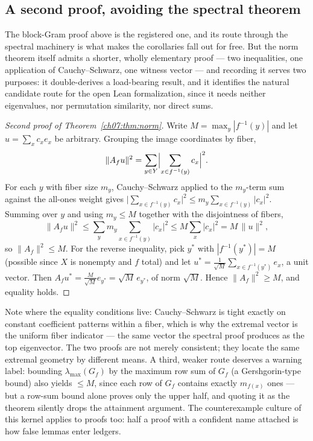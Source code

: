 \subsection{A second proof, avoiding the spectral theorem}\label{ch07:sec:secondproof}

The block-Gram proof above is the registered one, and its route through the
spectral machinery is what makes the corollaries fall out for free. But the
norm theorem itself admits a shorter, wholly elementary proof --- two
inequalities, one application of Cauchy--Schwarz, one witness vector ---
and recording it serves two purposes: it double-derives a load-bearing
result, and it identifies the natural candidate route for the open Lean
formalization, since it needs neither eigenvalues, nor permutation
similarity, nor direct sums.

\begin{proof}[Second proof of Theorem~\textup{\ref{ch07:thm:norm}}]
Write $M=\max_{y}|f^{-1}(y)|$ and let $u=\sum_x c_xe_x$ be arbitrary.
Grouping the image coordinates by fiber,
\[
\lVert A_fu\rVert^2
=\sum_{y\in Y}\Bigl|\sum_{x\in f^{-1}(y)}c_x\Bigr|^2 .
\]
For each $y$ with fiber size $m_y$, Cauchy--Schwarz applied to the
$m_y$-term sum against the all-ones weight gives
$\bigl|\sum_{x\in f^{-1}(y)}c_x\bigr|^2
\le m_y\sum_{x\in f^{-1}(y)}|c_x|^2$.
Summing over $y$ and using $m_y\le M$ together with the disjointness of
fibers,
\[
\lVert A_fu\rVert^2
\le \sum_y m_y\!\!\sum_{x\in f^{-1}(y)}\!\!|c_x|^2
\le M\sum_{x}|c_x|^2 = M\,\lVert u\rVert^2 ,
\]
so $\lVert A_f\rVert^2\le M$. For the reverse inequality, pick $y^\ast$
with $|f^{-1}(y^\ast)|=M$ (possible since $X$ is nonempty and $f$ total)
and let $u^\ast=\tfrac{1}{\sqrt M}\sum_{x\in f^{-1}(y^\ast)}e_x$, a unit
vector. Then $A_fu^\ast=\tfrac{M}{\sqrt M}e_{y^\ast}=\sqrt M\,e_{y^\ast}$,
of norm $\sqrt M$. Hence $\lVert A_f\rVert^2\ge M$, and equality holds.
\end{proof}

Note where the equality conditions live: Cauchy--Schwarz is tight exactly
on constant coefficient patterns within a fiber, which is why the extremal
vector is the uniform fiber indicator --- the same vector the spectral
proof produces as the top eigenvector. The two proofs are not merely
consistent; they locate the same extremal geometry by different means. A
third, weaker route deserves a warning label: bounding
$\lambda_{\max}(G_f)$ by the maximum row sum of $G_f$ (a Gershgorin-type
bound) also yields $\le M$, since each row of $G_f$ contains exactly
$m_{f(x)}$ ones --- but a row-sum bound alone proves only the upper half,
and quoting it as the theorem silently drops the attainment argument. The
counterexample culture of this kernel applies to proofs too: half a proof
with a confident name attached is how false lemmas enter ledgers.

